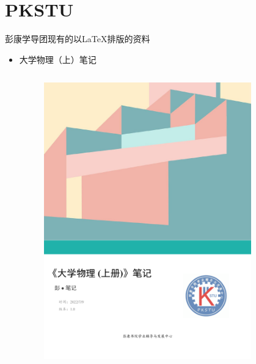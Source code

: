 \section{PKSTU}
\begin{frame}{彭康学导团现有的以\LaTeX 排版的资料}
    \begin{itemize}
        \item 大学物理（上）笔记 
        \begin{columns}
            \begin{column}{0.48\textwidth}
                \begin{figure}
                    \centering
                    \includegraphics[scale=0.2]{figures/PK_DW1.pdf}
                \end{figure}
            \end{column}
            \begin{column}{0.48\textwidth}
                \begin{figure}

\end{figure}
\end{column}
\end{columns}
\end{itemize}
\end{frame}
